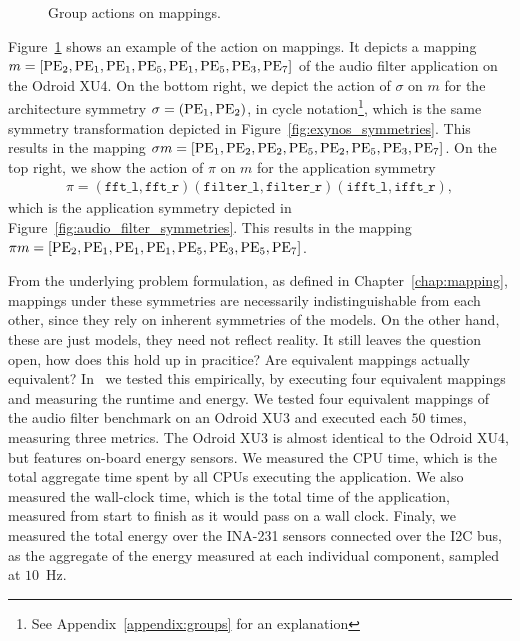 \begin{figure}[h]
	\centering
\resizebox{1.0\textwidth}{!}{
\begin{tikzpicture}
   
 \end{tikzpicture}
}
   \caption{Group actions on mappings.}
	\label{fig:mapping_action_example}
\end{figure}

Figure~\ref{fig:mapping_action_example} shows an example of the action on mappings. 
It depicts a mapping $m = [\operatorname{PE}_2,\operatorname{PE}_1,\operatorname{PE}_1,\operatorname{PE}_5,\operatorname{PE}_1,\operatorname{PE}_5,\operatorname{PE}_3,\operatorname{PE}_7]$ of the audio filter application on the Odroid XU4.
On the bottom right, we depict the action of $\sigma$ on $m$ for the architecture symmetry $\sigma = (\operatorname{PE}_1,\operatorname{PE}_2)$, in cycle notation\footnote{See Appendix~\ref{appendix:groups} for an explanation}, which is the same symmetry transformation depicted in Figure~\ref{fig:exynos_symmetries}.
This results in the mapping $\sigma m = [\operatorname{PE}_1,\operatorname{PE}_2,\operatorname{PE}_2,\operatorname{PE}_5,\operatorname{PE}_2,\operatorname{PE}_5,\operatorname{PE}_3,\operatorname{PE}_7]$.
On the top right, we show the action of $\pi$ on $m$ for the application symmetry
 \begin{align*} \pi =  (\texttt{fft\_l},\texttt{fft\_r})(\texttt{filter\_l},\texttt{filter\_r})(\texttt{ifft\_l},\texttt{ifft\_r}), \end{align*}
which is the application symmetry depicted in Figure~\ref{fig:audio_filter_symmetries}.
This results in the mapping $\pi m = [\operatorname{PE}_2,\operatorname{PE}_1,\operatorname{PE}_1,\operatorname{PE}_1,\operatorname{PE}_5,\operatorname{PE}_3,\operatorname{PE}_5,\operatorname{PE}_7]$.

From the underlying problem formulation, as defined in Chapter~\ref{chap:mapping}, mappings under these symmetries are necessarily indistinguishable from each other, since they rely on inherent symmetries of the models.
On the other hand, these are just models, they need not reflect reality.
It still leaves the question open, how does this hold up in pracitice?
Are equivalent mappings actually equivalent?
In~\cite{goens_scopes17} we tested this empirically, by executing four equivalent mappings and measuring the runtime and energy.
We tested four equivalent mappings of the audio filter benchmark on an Odroid XU3 and executed each $50$ times, measuring three metrics.
The Odroid XU3 is almost identical to the Odroid XU4, but features on-board energy sensors.
We measured the \acs{CPU} time, which is the total aggregate time spent by all \acsp{CPU} executing the application.
We also measured the wall-clock time, which is the total time of the application, measured from start to finish as it would pass on a wall clock.
Finaly, we measured the total energy over the INA-231 sensors connected over the I2C bus, as the aggregate of the energy measured at each individual component, sampled at $10$~Hz.

